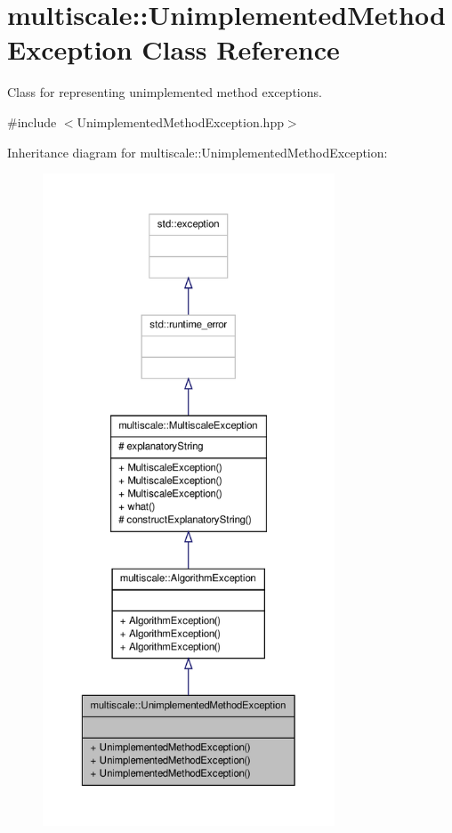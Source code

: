 \hypertarget{classmultiscale_1_1UnimplementedMethodException}{\section{multiscale\-:\-:\-Unimplemented\-Method\-Exception \-Class \-Reference}
\label{classmultiscale_1_1UnimplementedMethodException}
}


\-Class for representing unimplemented method exceptions.  




{\ttfamily \#include $<$\-Unimplemented\-Method\-Exception.\-hpp$>$}



\-Inheritance diagram for multiscale\-:\-:\-Unimplemented\-Method\-Exception\-:
\nopagebreak
\begin{figure}[H]
\begin{center}
\leavevmode
\includegraphics[height=550pt]{classmultiscale_1_1UnimplementedMethodException__inherit__graph}
\end{center}
\end{figure}


